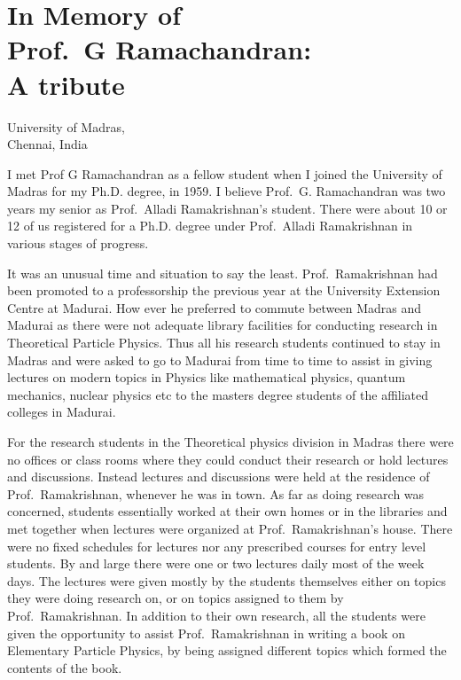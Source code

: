 \chapter[In Memory of Prof.\ G Ramachandran: A tribute]{In Memory of\\ Prof.\ G Ramachandran:\\ A tribute}\label{chap5}


\begin{center}
University of Madras,\\
Chennai, India
\end{center}

I met Prof G Ramachandran as a fellow student when I joined the University of Madras for my Ph.D. degree, in 1959. I believe Prof.\ G. Ramachandran was two years my senior as Prof.\ Alladi Ramakrishnan's student.  There were about 10 or 12 of us registered for a Ph.D. degree under Prof.\ Alladi Ramakrishnan in various stages of progress. 

It was an unusual time and situation  to say the least. Prof.\ Ramakrishnan had been promoted to a professorship the previous year at the University Extension Centre at Madurai. How ever he preferred to commute between Madras and Madurai as there were not adequate library facilities for conducting research in Theoretical Particle Physics. Thus all his research students continued to stay in Madras and were asked to go to Madurai from time to time to assist in giving lectures on modern topics in Physics like mathematical physics, quantum mechanics, nuclear physics etc to the masters degree students of the affiliated colleges in Madurai.

For the research students in the Theoretical physics division in Madras there were no offices or class rooms where they could conduct their research or hold lectures and discussions. Instead lectures and discussions were held at the residence of Prof.\ Ramakrishnan, whenever he was in town. As far as doing research was concerned, students essentially worked at their own homes or in the libraries and met together when lectures were organized at Prof.\  Ramakrishnan's house. There were no fixed schedules for lectures nor any prescribed courses for entry level students. By and large there were one or two lectures daily  most of the week days. The lectures were  given mostly by the students themselves either on topics they were doing research on, or on topics assigned to them by Prof.\ Ramakrishnan. In addition to their own research, all the students were given the opportunity to assist Prof.\ Ramakrishnan in writing a book on Elementary Particle Physics, by being assigned different topics which formed the contents of the book.

